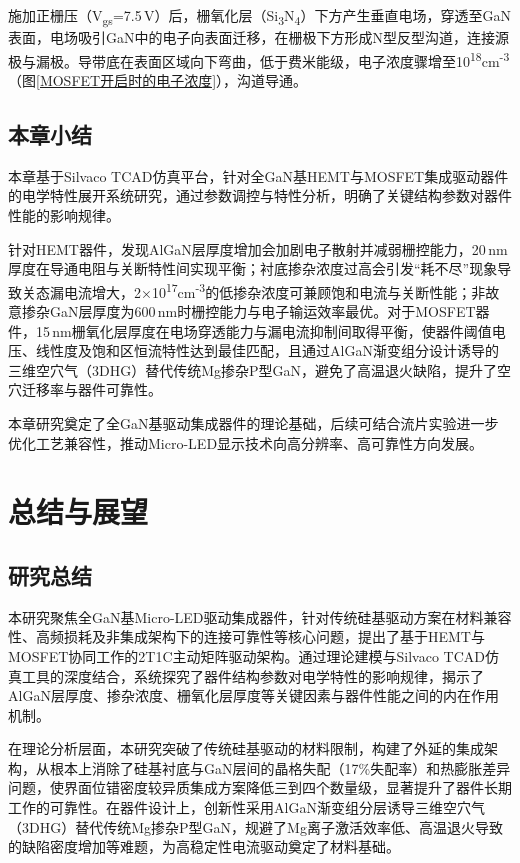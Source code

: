 \documentclass[
    oneside,                %
    fontset = win, %
  ]{njuthesis}
\begin{document}
施加正栅压（V\textsubscript{gs}=7.5\,V）后，栅氧化层（Si\textsubscript{3}N\textsubscript{4}）下方产生垂直电场，穿透至GaN表面，电场吸引GaN中的电子向表面迁移，在栅极下方形成N型反型沟道，连接源极与漏极。导带底在表面区域向下弯曲，低于费米能级，电子浓度骤增至10\textsuperscript{18}cm\textsuperscript{-3}（图\ref{MOSFET开启时的电子浓度}），沟道导通。

\section{本章小结}


本章基于Silvaco TCAD仿真平台，针对全GaN基HEMT与MOSFET集成驱动器件的电学特性展开系统研究，通过参数调控与特性分析，明确了关键结构参数对器件性能的影响规律。

针对HEMT器件，发现AlGaN层厚度增加会加剧电子散射并减弱栅控能力，20\,nm厚度在导通电阻与关断特性间实现平衡；衬底掺杂浓度过高会引发“耗不尽”现象导致关态漏电流增大，2×10\textsuperscript{17}cm\textsuperscript{-3}的低掺杂浓度可兼顾饱和电流与关断性能；非故意掺杂GaN层厚度为600\,nm时栅控能力与电子输运效率最优。对于MOSFET器件，15\,nm栅氧化层厚度在电场穿透能力与漏电流抑制间取得平衡，使器件阈值电压、线性度及饱和区恒流特性达到最佳匹配，且通过AlGaN渐变组分设计诱导的三维空穴气（3DHG）替代传统Mg掺杂P型GaN，避免了高温退火缺陷，提升了空穴迁移率与器件可靠性。

本章研究奠定了全GaN基驱动集成器件的理论基础，后续可结合流片实验进一步优化工艺兼容性，推动Micro-LED显示技术向高分辨率、高可靠性方向发展。


\chapter{总结与展望}

\section{研究总结}

本研究聚焦全GaN基Micro-LED驱动集成器件，针对传统硅基驱动方案在材料兼容性、高频损耗及非集成架构下的连接可靠性等核心问题，提出了基于HEMT与MOSFET协同工作的2T1C主动矩阵驱动架构。通过理论建模与Silvaco TCAD仿真工具的深度结合，系统探究了器件结构参数对电学特性的影响规律，揭示了AlGaN层厚度、掺杂浓度、栅氧化层厚度等关键因素与器件性能之间的内在作用机制。

在理论分析层面，本研究突破了传统硅基驱动的材料限制，构建了外延的集成架构，从根本上消除了硅基衬底与GaN层间的晶格失配（17\%失配率）和热膨胀差异问题，使界面位错密度较异质集成方案降低三到四个数量级\cite{liu2024ultra}，显著提升了器件长期工作的可靠性。在器件设计上，创新性采用AlGaN渐变组分层诱导三维空穴气（3DHG）替代传统Mg掺杂P型GaN，规避了Mg离子激活效率低、高温退火导致的缺陷密度增加等难题，为高稳定性电流驱动奠定了材料基础。
\end{document}
